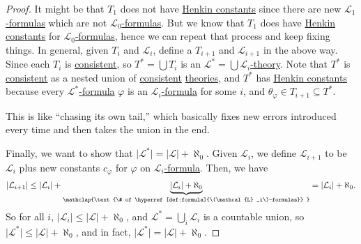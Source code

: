 \begin{proof}
	It might be that \(T_1\) does not have \hyperref[def:Henkin-constant]{Henkin constants} since there are new \hyperref[def:formula]{\(\mathcal{L} _1\)-formulas} which are not \hyperref[def:formula]{\(\mathcal{L} _0\)-formulas}. But we know that \(T_1\) does have \hyperref[def:Henkin-constant]{Henkin constants} for \hyperref[def:formula]{\(\mathcal{L} _0\)-formulas}, hence we can repeat that process and keep fixing things. In general, given \(T_{i} \) and \(\mathcal{L} _i\), define a \(T_{i+1}\) and \(\mathcal{L} _{i+1}\) in the above way. Since each \(T_i\) is \hyperref[def:consistent]{consistent}, so \(T^{\ast} = \bigcup T_i\) is an \hyperref[def:theory]{\(\mathcal{L} ^{\ast} = \bigcup \mathcal{L} _i\)-theory}. Note that \(T^{\ast} \) is \hyperref[def:consistent]{consistent} as a nested union of \hyperref[def:consistent]{consistent} \hyperref[def:theory]{theories}, and \(T^{\ast} \) has \hyperref[def:Henkin-constant]{Henkin constants} because every \hyperref[def:formula]{\(\mathcal{L} ^{\ast} \)-formula} \(\varphi \) is an \hyperref[def:formula]{\(\mathcal{L} _i\)-formula} for some \(i\), and \(\theta _\varphi \in T_{i+1} \subseteq T^{\ast} \).

	\begin{intuition}
		This is like ``chasing its own tail,'' which basically fixes new errors introduced every time and then takes the union in the end.
	\end{intuition}

	Finally, we want to show that \(\vert \mathcal{L} ^{\ast} \vert = \vert \mathcal{L} \vert + \aleph _0\). Given \(\mathcal{L} _i\), we define \(\mathcal{L} _{i+1}\) to be \(\mathcal{L} _i\) plus new constants \(c_\varphi \) for \(\varphi \) on \hyperref[def:formula]{\(\mathcal{L} _i\)-formula}. Then, we have
	\[
		\vert \mathcal{L} _{i+1} \vert
		\leq \vert \mathcal{L} _i \vert + \underbrace{\vert \mathcal{L} _i \vert + \aleph_0}_{\mathclap{\text{\# of \hyperref[def:formula]{\(\mathcal{L} _i\)-formulas}} }}
		= \vert \mathcal{L} _i \vert + \aleph_0.
	\]
	So for all \(i\), \(\vert \mathcal{L} _i \vert \leq \vert \mathcal{L}  \vert + \aleph_0\), and \(\mathcal{L} ^{\ast} = \bigcup_{i} \mathcal{L} _i\) is a countable union, so \(\vert \mathcal{L} ^{\ast} \vert \leq \vert \mathcal{L}  \vert + \aleph_0\), and in fact, \(\vert \mathcal{L} ^{\ast}  \vert = \vert \mathcal{L}  \vert + \aleph_0\).
\end{proof}

